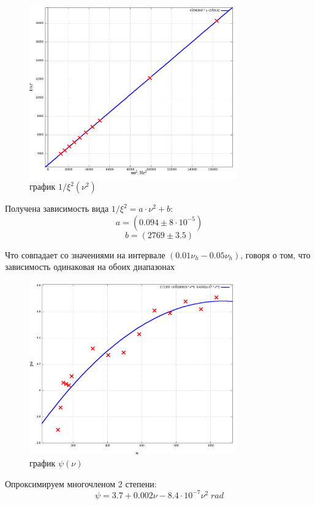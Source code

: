 \documentclass{article}
\begin{document}
\begin{figure}[H]
    \centering
    \includegraphics[width=0.8\textwidth]{2.png}
    \caption{график \( 1/\xi^2(\nu^2) \)}
    \label{plot2}
\end{figure}

Получена зависимость вида \( 1/\xi^2 = a\cdot \nu^2 + b \):
\[ a = (0.094 \pm 8\cdot10^{-5}) \]
\[ b = (2769 \pm 3.5) \]

Что совпадает со значениями на интервале \((0.01\nu_h - 0.05\nu_h)\), говоря о том, 
что зависимость одинаковая на обоих диапазонах

\begin{figure}[H]
    \centering
    \includegraphics[width=0.8\textwidth]{3.png}
    \caption{график \( \psi(\nu) \)}
\end{figure}

Опроксимируем многочленом 2 степени:
\[ \psi = 3.7 + 0.002\nu -8.4\cdot 10^{-7}\nu^2\; rad \]
\end{document}
